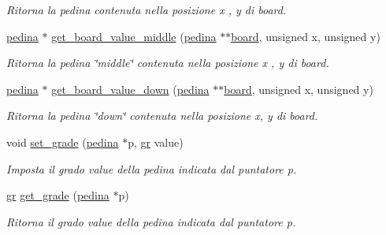 \begin{DoxyCompactItemize}
\begin{DoxyCompactList}\small\item\em Ritorna la {\itshape pedina} contenuta nella posizione {\itshape x} , {\itshape y} di {\itshape board}. \end{DoxyCompactList}\item 
\hyperlink{ml__lib_8h_a71fee95122b31f5cb0b07d9c16ffa3a5}{pedina} $\ast$ \hyperlink{group__Funzioni_ga59156018c085ef9af6563790b63c28d5}{get\+\_\+board\+\_\+value\+\_\+middle} (\hyperlink{ml__lib_8h_a71fee95122b31f5cb0b07d9c16ffa3a5}{pedina} $\ast$$\ast$\hyperlink{ml__main_8c_a62a3fe3d1df9ff58883b669f7f24e516}{board}, unsigned x, unsigned y)
\begin{DoxyCompactList}\small\item\em Ritorna la {\itshape pedina} \char`\"{}middle\char`\"{} contenuta nella posizione {\itshape x} , {\itshape y} di {\itshape board}. \end{DoxyCompactList}\item 
\hyperlink{ml__lib_8h_a71fee95122b31f5cb0b07d9c16ffa3a5}{pedina} $\ast$ \hyperlink{group__Funzioni_gae874c64d588c5865633fc342fbbbafaa}{get\+\_\+board\+\_\+value\+\_\+down} (\hyperlink{ml__lib_8h_a71fee95122b31f5cb0b07d9c16ffa3a5}{pedina} $\ast$$\ast$\hyperlink{ml__main_8c_a62a3fe3d1df9ff58883b669f7f24e516}{board}, unsigned x, unsigned y)
\begin{DoxyCompactList}\small\item\em Ritorna la {\itshape pedina} \char`\"{}down\char`\"{} contenuta nella posizione {\itshape x}, {\itshape y} di {\itshape board}. \end{DoxyCompactList}\item 
void \hyperlink{group__Funzioni_ga663d3a2fcf86042d03eb834766b7adea}{set\+\_\+grade} (\hyperlink{ml__lib_8h_a71fee95122b31f5cb0b07d9c16ffa3a5}{pedina} $\ast$p, \hyperlink{ml__lib_8h_a25f6e8adc446355e3f42092ecf9d598c}{gr} value)
\begin{DoxyCompactList}\small\item\em Imposta il grado {\itshape value} della pedina indicata dal puntatore {\itshape p}. \end{DoxyCompactList}\item 
\hyperlink{ml__lib_8h_a25f6e8adc446355e3f42092ecf9d598c}{gr} \hyperlink{group__Funzioni_ga6ceb2e2fb4d39456d2b64b64f4841c67}{get\+\_\+grade} (\hyperlink{ml__lib_8h_a71fee95122b31f5cb0b07d9c16ffa3a5}{pedina} $\ast$p)
\begin{DoxyCompactList}\small\item\em Ritorna il grado {\itshape value} della pedina indicata dal puntatore {\itshape p}. \end{DoxyCompactList}\item 

\end{DoxyCompactItemize}
